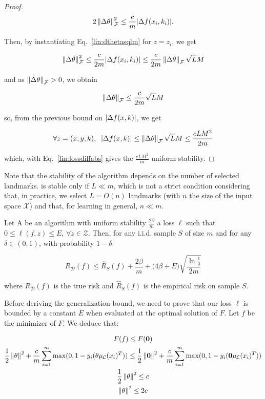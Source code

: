 \begin{proof}
    $$ 2 \left\| \Delta\theta \right\|_{\mathcal{F}}^2 \leq \frac{c}{m} | \Delta f(x_i,k_i) |.$$

    Then, by instantiating Eq.~\eqref{lin:dthetasqlm} for $z = z_i$, we get

    $$\left\| \Delta\theta \right\|_{\mathcal{F}}^2 \leq \frac{c}{2m} | \Delta f(x_i,k_i) | \leq \frac{c}{2m} \left\| \Delta\theta \right\|_{\mathcal{F}} \sqrt{L} M$$

    and as $\left\| \Delta\theta \right\|_{\mathcal{F}} > 0$, we obtain

    $$ \left\| \Delta\theta \right\|_{\mathcal{F}} \leq \frac{c}{2m} \sqrt{L} M $$

    so, from the previous bound on $| \Delta f(x,k) |$, we get

    $$ \forall z=(x,y,k), \;\; | \Delta f(x,k) | \leq \left\| \Delta\theta \right\|_{\mathcal{F}} \sqrt{L} M \leq \frac{c L M^2}{2m}$$

    which, with Eq.~\eqref{lin:lossdiffabs} gives the $\frac{c L M^2}{m}$ uniform stability.


\end{proof}

Note that the stability of the algorithm depends on the number of selected landmarks. \landSVM is stable only if $L \ll m$, which is not a strict condition considering that, in practice, we select $L = O(n)$ landmarks (with $n$ the size of the input space $\mathcal{X}$) and that, for learning in general, $n \ll m$.

\begin{thm}{\cite{bousquet2002stability}}
Let A be an algorithm with uniform stability $\frac{2\beta}{m}$ \wrt a loss $\ell$ such that $0 \leq \ell(f,z) \leq E$, $\forall z \in \mathcal{Z}$. Then, for any i.i.d. sample $S$ of size $m$ and for any $\delta \in (0,1)$, with probability $1- \delta$:

$$ R_{\mathcal{D}}(f) \leq \hat{R}_{S}(f) + \frac{2\beta}{m} + \big( 4\beta + E \big) \sqrt{\frac{\ln \frac{1}{\delta}}{2m}}$$

where $R_{\mathcal{D}}(f)$ is the true risk and $\hat{R}_{S}(f)$ is the empirical risk on sample $S$. 

\end{thm}

Before deriving the generalization bound, we need to prove that our loss $\ell$ is bounded by a constant $E$ when evaluated at the optimal solution of $F$. Let $f$ be the minimizer of $F$. We deduce that:

\begin{gather}
    F(f) \leq F(\bm{0}) \nonumber \\
    \frac{1}{2} \norm{\theta}^2 + \frac{c}{m} \sumi \max(0,1-y_i (\theta \mul{x_i}^T)) \leq \frac{1}{2} \norm{\bm{0}}^2 + \frac{c}{m} \sumi \max(0,1-y_i (\bm{0} \mul{x_i}^T)) \nonumber \\
    \frac{1}{2} \norm{\theta}^2  \leq c \label{eq:sum} \\ 
    \norm{\theta}^2  \leq 2c \nonumber
\end{gather}

